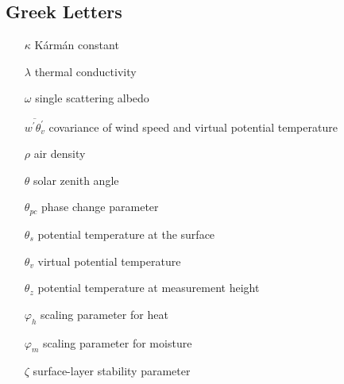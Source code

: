 \subsection{Greek Letters}
\begin{enumerate}
    \item[$\kappa$]	K\'{a}rm\'{a}n constant
    \item[$\lambda$] thermal conductivity
    \item[$\omega$] single scattering albedo
    \item[$\overline{w^{\prime}\theta_{v}^{\prime}}$] covariance of wind speed and virtual potential temperature
    \item[$\rho$] air density
    \item[$\theta$] solar zenith angle
    \item[$\theta_{pc}$] phase change parameter
    \item[$\theta_{s}$]	potential temperature at the surface
    \item[$\theta_{v}$]	virtual potential temperature
    \item[$\theta_{z}$]	potential temperature at measurement height
    \item[$\varphi_{h}$] scaling parameter for heat
    \item[$\varphi_{m}$] scaling parameter for moisture
    \item[$\zeta$]	surface-layer stability parameter
\end{enumerate}
